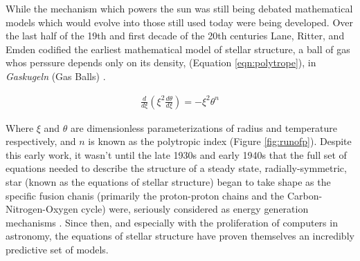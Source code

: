 While the mechanism which powers the sun was still being debated mathematical
models which would evolve into those still used today were being developed.
Over the last half of the 19th and first decade of the 20th centuries Lane,
Ritter, and Emden codified the earliest mathematical model of stellar
structure, a ball of gas whos perssure depends only on its density, (Equation \ref{eqn:polytrope}), in \textit{Gaskugeln}
(Gas Balls) \citep{Emden1907}.

\begin{align}\label{eqn:polytrope}
	\frac{d}{d\xi}\left(\xi^{2}\frac{d\theta}{d\xi}\right) = -\xi^{2}\theta^{n}
\end{align}

Where $\xi$ and $\theta$ are dimensionless parameterizations of radius and
temperature respectively, and $n$ is known as the polytropic index (Figure
\ref{fig:runofp}). Despite this early work, it wasn't until the late 1930s and
early 1940s that the full set of equations needed to describe the structure of
a steady state, radially-symmetric, star (known as the equations of stellar
structure) began to take shape as the specific fusion chanis (primarily the
proton-proton chains and the Carbon-Nitrogen-Oxygen cycle) were, seriously
considered as energy generation mechanisms \citep{Cowling1966}. Since then, and
especially with the proliferation of computers in astronomy, the equations of
stellar structure have proven themselves an incredibly predictive set of
models.  

